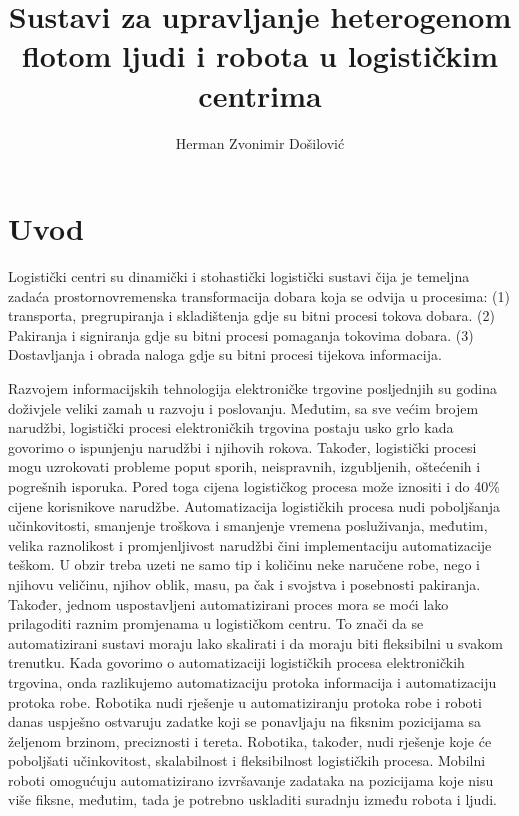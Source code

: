 \documentclass[times, utf8, seminar]{fer}
\begin{document}


\title{
    Sustavi za upravljanje heterogenom flotom ljudi i robota u logističkim centrima
}

\author{Herman Zvonimir Došilović}

\maketitle

\tableofcontents

\chapter{Uvod}
Logistički centri su dinamički i stohastički logistički sustavi
čija je temeljna zadaća prostornovremenska transformacija
dobara koja se odvija u procesima: (1) transporta, pregrupiranja i skladištenja gdje
su bitni procesi tokova dobara. (2) Pakiranja i signiranja gdje su bitni procesi
pomaganja tokovima dobara. (3) Dostavljanja i obrada naloga gdje su bitni procesi
tijekova informacija. \citep{Paladin, buntak2012medjusobni}

Razvojem informacijskih tehnologija elektroničke trgovine 
 posljednjih su godina
doživjele veliki zamah u razvoju i poslovanju. Međutim, sa sve većim brojem narudžbi,
logistički procesi elektroničkih trgovina postaju usko grlo kada govorimo o 
ispunjenju narudžbi i njihovih rokova. Također, logistički procesi mogu uzrokovati
probleme poput sporih, neispravnih, izgubljenih, oštećenih i pogrešnih isporuka. 
Pored toga cijena logističkog procesa može iznositi
i do 40\% cijene korisnikove narudžbe.
Automatizacija logističkih procesa nudi poboljšanja učinkovitosti, smanjenje troškova
i smanjenje vremena posluživanja, međutim, velika raznolikost i promjenljivost
narudžbi čini implementaciju automatizacije teškom. U obzir treba uzeti
ne samo tip i količinu neke naručene robe, nego i njihovu veličinu, njihov 
oblik, masu, pa čak i svojstva i posebnosti pakiranja. Također, jednom
uspostavljeni automatizirani proces mora se moći lako prilagoditi 
raznim promjenama u logističkom centru. To znači da se automatizirani sustavi
moraju lako skalirati i da moraju biti fleksibilni u svakom trenutku.
Kada govorimo o automatizaciji logističkih procesa elektroničkih trgovina, onda
razlikujemo automatizaciju protoka informacija i automatizaciju protoka robe.
Robotika nudi rješenje u automatiziranju protoka robe i roboti danas uspješno
ostvaruju zadatke koji se ponavljaju na fiksnim pozicijama sa željenom brzinom,
preciznosti i tereta. Robotika, također, nudi rješenje koje će
poboljšati učinkovitost, skalabilnost i fleksibilnost logističkih procesa.
Mobilni roboti omogućuju automatizirano izvršavanje zadataka na pozicijama
koje nisu više fiksne, međutim, tada je potrebno uskladiti suradnju između robota
i ljudi. \citep{huang2015robotics}
\end{document}

